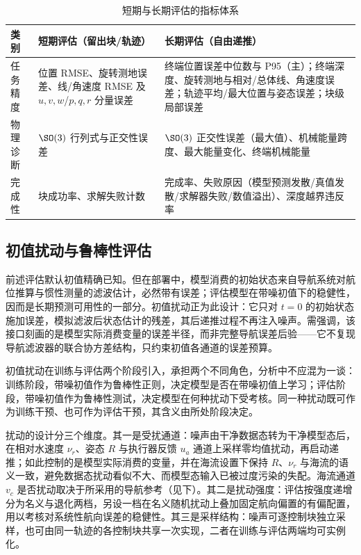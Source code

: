 \begin{table}[htbp]
  \centering
  \caption{短期与长期评估的指标体系}
  \label{tab:metrics}
  \begin{tabularx}{\textwidth}{>{\raggedright\arraybackslash}p{}>{\raggedright\arraybackslash}X>{\raggedright\arraybackslash}X}
    \toprule
    类别 & 短期评估（留出块/轨迹） & 长期评估（自由递推） \\
    \midrule
    任务精度 & 位置 RMSE、旋转测地误差、线/角速度 RMSE 及 \(u,v,w\)/\(p,q,r\) 分量误差 & 终端位置误差中位数与 P95（主）；终端深度、旋转测地与相对/总体线、角速度误差；轨迹平均/最大位置与姿态误差；块级局部误差 \\
    物理诊断 & \(\SO(3)\) 行列式与正交性误差 & \(\SO(3)\) 正交性误差（最大值）、机械能量跨度、最大能量变化、终端机械能量 \\
    完成性 & 块成功率、求解失败计数 & 完成率、失败原因（模型预测发散/真值发散/求解器失败/数值溢出）、深度越界违反率 \\
    \bottomrule
  \end{tabularx}
\end{table}

\subsection{初值扰动与鲁棒性评估}
\label{subsec:ic-perturbation}

前述评估默认初值精确已知。但在部署中，模型消费的初始状态来自导航系统对航位推算与惯性测量的滤波估计，必然带有误差；评估模型在带噪初值下的稳健性，因而是长期预测可用性的一部分。初值扰动正为此设计：它只对 \(t=0\) 的初始状态施加误差，模拟滤波后状态估计的残差，其后递推过程不再注入噪声。需强调，该接口刻画的是模型实际消费变量的误差半径，而非完整导航误差后验——它不复现导航滤波器的联合协方差结构，只约束初值各通道的误差预算。

初值扰动在训练与评估两个阶段引入，承担两个不同角色，分析中不应混为一谈：训练阶段，带噪初值作为鲁棒性正则，决定模型是否在带噪初值上学习；评估阶段，带噪初值作为鲁棒性测试，决定模型在何种扰动下受考核。同一种扰动既可作为训练干预、也可作为评估干预，其含义由所处阶段决定。

扰动的设计分三个维度。其一是受扰通道：噪声由干净数据态转为干净模型态后，在相对水速度 \(\nu_r\)、姿态 \(R\) 与执行器反馈 \(u_a\) 通道上采样零均值扰动，再启动递推；如此控制的是模型实际消费的变量，并在海流设置下保持 \(R\)、\(\nu_r\) 与海流的语义一致，避免数据态扰动看似不大、而模型态输入已被过度污染的失配。海流通道 \(v_c\) 是否扰动取决于所采用的导航参考（见下）。其二是扰动强度：评估按强度递增分为名义与退化两档，另设一档在名义随机扰动上叠加固定航向偏置的有偏配置，用以考核对系统性航向误差的稳健性。其三是采样结构：噪声可逐控制块独立采样，也可由同一轨迹的各控制块共享一次实现，二者在训练与评估两端均可实例化。

